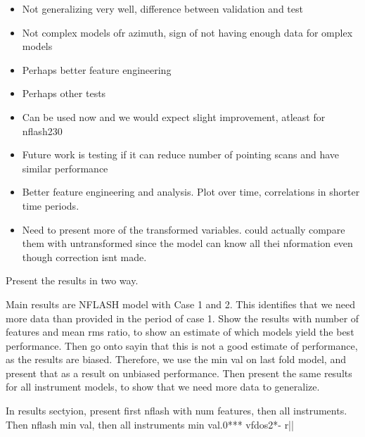 \begin{itemize}
    \item Not generalizing very well, difference between validation and test
    \item Not complex models ofr azimuth, sign of not having enough data for omplex models
    \item Perhaps better feature engineering
    \item Perhaps other tests
    \item Can be used now and we would expect slight improvement, atleast for nflash230
    \item Future work is testing if it can reduce number of pointing scans and have similar performance
    \item Better feature engineering and analysis. Plot over time, correlations in shorter time periods.
    \item Need to present more of the transformed variables. could actually compare them with untransformed since the model can know all thei nformation even though correction isnt made.
\end{itemize}


Present the results in two way.

Main results are NFLASH model with Case 1 and 2. This identifies that we need more data than provided in the period of case 1.
Show the results with number of features and mean rms ratio, to show an estimate of which models yield the best performance.
Then go onto sayin that this is not a good estimate of performance, as the results are biased. Therefore, we use the min val on last fold model,
and present that as a result on unbiased performance.
Then present the same results for all instrument models, to show that we need more data to generalize.


In results sectyion, present first nflash with num features, then all instruments. Then nflash min val, then all instruments min val.0*** vfdos2*-
r||